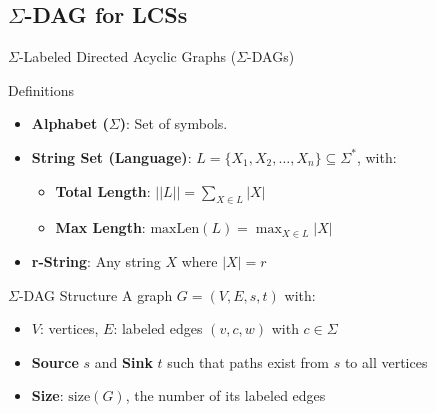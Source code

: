 \documentclass{beamer}
\begin{document}
\subsection{$\Sigma$-DAG for LCSs}
\begin{frame}{$\Sigma$-Labeled Directed Acyclic Graphs ($\Sigma$-DAGs)}

    \begin{block}{Definitions}
        \begin{itemize}
            \item \textbf{Alphabet ($\Sigma$)}: Set of symbols.
            \item \textbf{String Set (Language)}: \( L = \{ X_1, X_2, \dots, X_n \} \subseteq \Sigma^* \), with:
                  \begin{itemize}
                      \item \textbf{Total Length}: \( ||L|| = \sum_{X \in L} |X| \)
                      \item \textbf{Max Length}: \( \text{maxLen}(L) = \max_{X \in L} |X| \)
                  \end{itemize}
            \item \textbf{r-String}: Any string \( X \) where \( |X| = r \)
        \end{itemize}
    \end{block}

    \begin{block}{$\Sigma$-DAG Structure}
        A graph \( G = (V, E, s, t) \) with:
        \begin{itemize}
            \item \( V \): vertices, \( E \): labeled edges \( (v, c, w) \) with \( c \in \Sigma \)
            \item \textbf{Source} \( s \) and \textbf{Sink} \( t \) such that paths exist from \( s \) to all vertices
            \item \textbf{Size}: \( \text{size}(G) \), the number of its labeled edges
        \end{itemize}
    \end{block}
\end{frame}
\end{document}
